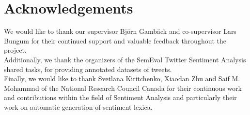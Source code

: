 \section*{Acknowledgements}

We would like to thank our supervisor Björn Gambäck and co-supervisor Lars Bungum for their continued support and valuable feedback throughout the project. \\

Additionally, we thank the organizers of the SemEval Twitter Sentiment Analysis shared tasks, for providing annotated datasets of tweets. \\

Finally, we would like to thank Svetlana Kiritchenko, Xiaodan Zhu and Saif M. Mohammad of the National Research Council Canada for their continuous work and contributions within the field of Sentiment Analysis and particularly their work on automatic generation of sentiment lexica.
